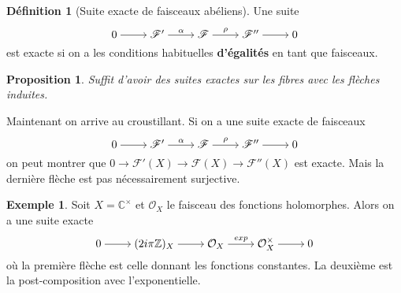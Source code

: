 \documentclass[a4paper,12pt]{book}
\newcommand{\Z}{\mathbb{Z}}
\newcommand{\C}{\mathbb{C}}
\newcommand{\Or}{\mathcal{O}}
\newcommand{\F}{\mathscr F}
\theoremstyle{plain}
\newtheorem{prop}[subsection]{Proposition}
\theoremstyle{definition}
\newtheorem{defn}[subsection]{Définition}
\newtheorem{ex}[subsection]{Exemple}
\theoremstyle{remark}
\begin{document}
\begin{defn}[Suite exacte de faisceaux abéliens]
    Une suite 
\[\begin{tikzcd}[ampersand replacement=\&,cramped]
	0 \& {\mathscr F'} \& {\mathscr F} \& {\mathscr F''} \& 0
	\arrow[from=1-1, to=1-2]
	\arrow["\alpha", from=1-2, to=1-3]
	\arrow["\rho", from=1-3, to=1-4]
	\arrow[from=1-4, to=1-5]
\end{tikzcd}\]
    est exacte si on a les conditions habituelles \textbf{d'égalités}
    en tant que faisceaux.
\end{defn}
\begin{prop}
    Suffit d'avoir des suites exactes sur les fibres avec les flèches
    induites.
\end{prop}

Maintenant on arrive au croustillant. Si on a une suite exacte de 
faisceaux
\[\begin{tikzcd}[ampersand replacement=\&,cramped]
	0 \& {\mathscr F'} \& {\mathscr F} \& {\mathscr F''} \& 0
	\arrow[from=1-1, to=1-2]
	\arrow["\alpha", from=1-2, to=1-3]
	\arrow["\rho", from=1-3, to=1-4]
	\arrow[from=1-4, to=1-5]
\end{tikzcd}\]
on peut montrer que $0\to \F'(X)\to\F(X)\to \F''(X)$ est exacte. Mais 
la dernière flèche est pas nécessairement surjective.
\begin{ex}
    Soit $X=\C^{\times}$ et $\Or_X$ le faisceau des fonctions 
    holomorphes. Alors on a une suite exacte 
\[\begin{tikzcd}[ampersand replacement=\&,cramped]
	0 \& {(2i\pi\Z)_X} \& {\mathcal O_X} \& {\mathcal O_X^{\times}} \& 0
	\arrow[from=1-1, to=1-2]
	\arrow[from=1-2, to=1-3]
	\arrow["exp", from=1-3, to=1-4]
	\arrow[from=1-4, to=1-5]
\end{tikzcd}\]
    où la première flèche est celle donnant les fonctions constantes.
    La deuxième est la post-composition avec l'exponentielle.
\end{ex}
\end{document}
